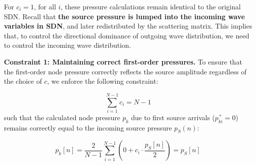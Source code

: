 \documentclass[journal]{IEEEtran}
\begin{document}
For $c_i = 1$, for all $i$, these pressure calculations remain identical to the original SDN. Recall that \textbf{the source pressure is lumped into the incoming wave variables in SDN}, and later redistributed by the scattering matrix. 
This implies that, to control the directional dominance of outgoing wave distribution, we need to control the incoming wave distribution.

\textbf{Constraint 1: Maintaining correct first-order pressures.}
To ensure that the first-order node pressure correctly reflects the source amplitude regardless of the choice of $c$, we enforce the following constraint:

\begin{equation}
    \label{eq:constraint_ci}
    \sum_{i=1}^{N-1} c_i = N-1
\end{equation}
%
such that the calculated node pressure $p_{k}$ due to first source arrivals ($p_{ki}^{+} = 0$) remains correctly equal to the incoming source pressure $p_{S}(n)$: 

\begin{equation}
    \label{eq:node_pressure_swsdn_first}
    p_k[n] = \frac{2}{N-1} \sum_{i=1}^{N-1} \left( 0 + c_{i} \cdot \frac{p_{S}[n]}{2}\right) = p_{S}[n]
\end{equation}

\end{document}
